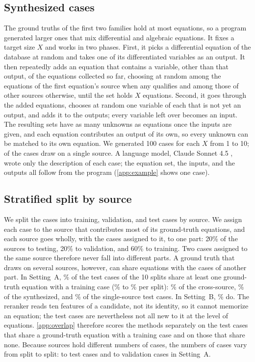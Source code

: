 \subsection{Synthesized cases}\label{sec:synth}

The ground truths of the first two families hold at most \MaxKSingle{} equations, so a program
generated larger ones that mix differential and algebraic equations. It fixes a target size $X$ and
works in two phases. First, it picks a differential equation of the database at
random and takes one of its differentiated variables as an output. It then repeatedly adds an
equation that contains a variable, other than that output, of the equations collected so far,
choosing at random among the equations of the first equation's source when any qualifies and among
those of other sources otherwise, until the set holds $X$ equations. Second, it goes through the
added equations, chooses at random one variable of each that is not yet an output, and adds it to
the outputs; every variable left over becomes an input. The resulting sets have as many unknowns as
equations once the inputs are given, and each equation contributes an output of its own, so every
unknown can be matched to its own equation. We generated 100 cases for each $X$ from 1 to 10;
\NSynthOneSource{} of the \NSynth{} cases draw on a single source. A language model, Claude Sonnet
4.5 \citep{ClaudeSonnet45}, wrote only the description of each case; the equation set, the inputs,
and the outputs all follow from the program (\ref{app:example} shows one case).

\subsection{Stratified split by source}\label{sec:split}

We split the cases into training, validation, and test cases by source. We assign each case to the
source that contributes most of its ground-truth equations, and each source goes wholly, with the
cases assigned to it, to one part: 20\% of the sources to testing, 20\% to validation, and 60\% to
training. Two cases assigned to the same source therefore never fall into different parts. A ground
truth that draws on several sources, however, can share equations with the cases of another part.
In Setting~A, \ShareSharedEqA\% of the test cases of the 10 splits share at least one ground-truth
equation with a training case (\ShareSharedEqAMin\% to \ShareSharedEqAMax\% per split): \ShareSharedEqCross\%
of the cross-source, \ShareSharedEqSynth\% of the synthesized, and \ShareSharedEqSingle\% of the
single-source test cases. In Setting~B, \ShareSharedEqB\% do. The reranker reads ten features of a
candidate, not its identity, so it cannot memorize an equation; the test cases are nevertheless not
all new to it at the level of equations. \ref{app:overlap} therefore scores the methods separately
on the test cases that share a ground-truth equation with a training case and on those that share
none. Because sources hold different numbers of cases, the numbers of cases
vary from split to split: \NTestAMin{} to \NTestAMax{} test cases and \NValAMin{} to \NValAMax{}
validation cases in Setting~A.


